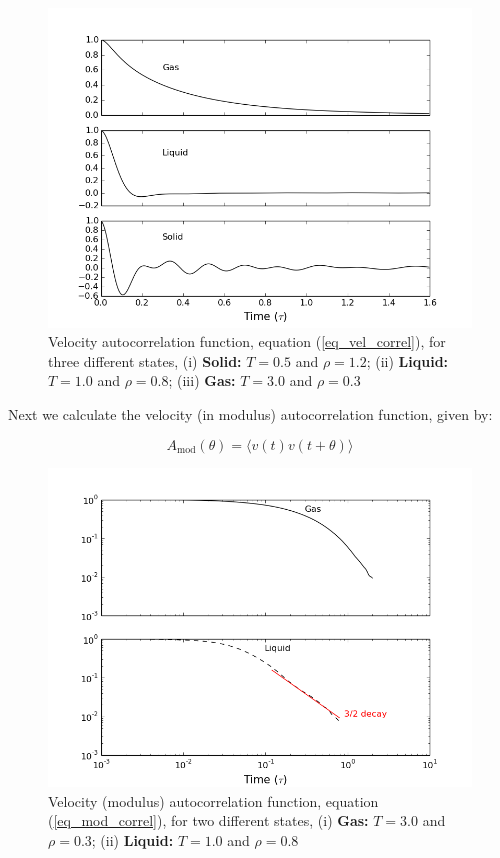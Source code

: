 \documentclass[aps,prl,reprint,groupedaddress]{revtex4-1}
\begin{document}
\begin{figure}[ht]
	\includegraphics[scale=0.4]{vel_correl.png}
	\caption{Velocity autocorrelation function, equation (\ref{eq_vel_correl}), for three different states, (i) \textbf{Solid:} $T = 0.5$ and $\rho = 1.2$; (ii) \textbf{Liquid:} $T = 1.0$ and $\rho = 0.8$; (iii) \textbf{Gas:} $T = 3.0$ and $\rho = 0.3$ \label{vel_correl}}
\end{figure}

Next we calculate the velocity (in modulus) autocorrelation function, given by:

\begin{equation}\label{eq_mod_correl}
	A_{\text{mod}}(\theta) = \langle v(t) v(t+\theta) \rangle
\end{equation}

\begin{figure}[ht]
	\includegraphics[scale=0.4]{decay.png}
	\caption{Velocity (modulus) autocorrelation function, equation (\ref{eq_mod_correl}), for two different states, (i) \textbf{Gas:} $T = 3.0$ and $\rho = 0.3$; (ii) \textbf{Liquid:} $T = 1.0$ and $\rho = 0.8$ \label{vel_decay}}
\end{figure}
\end{document}
